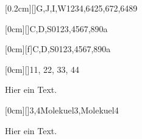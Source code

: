 \documentclass[./main.tex]{subfiles}
\begin{document}


\kastenarray[2.5cm]{3cm}[0.2cm][]{G,J,I,W}{1234,6425,672,6489}

\kastenarray[3cm]{4cm}[0cm][]{C,D,S}{0123,4567,890a}

\kastenarray{2cm}[0cm][f]{C,D,S}{0123,4567,890a}


\kastenarraycustom{2cm}[0cm][]{11, 22, 33, 44}

Hier ein Text.



\kastenarray[7cm]{7cm}[0cm][]{3,4}{Molekuel3,Molekuel4}

Hier ein Text. \newpage \aufgabenende
\end{document}
